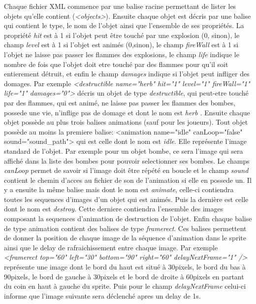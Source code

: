 		Chaque fichier XML commence par une balise racine permettant de lister les objets qu'elle contient (\textit{<objects>}). Ensuite chaque objet est décris par une balise  qui contient le type, le nom de l'objet ainsi que l'ensemble de ses propriétés. La propriété \textit{hit} est à 1 si l'objet peut être touché par une explosion (0, sinon), le champ \textit{level} est à 1 si l'objet est animés (0,sinon), le champ \textit{fireWall} est à 1 si l'objet ne laisse pas passer les flammes des explosions, le champ \textit{life} indique le nombre de fois que l'objet doit etre touché par des flammes pour qu'il soit entierement détruit, et enfin le champ \textit{damages} indique si l'objet peut infliger des domages. Par exemple \textit{<destructible name="herb" hit="1" level="1" fireWall="1" life="1" damages="0">} décris un objet de type \textit{destructible}, qui peut-etre touché par des flammes, qui est animé, ne laisse pas passer les flammes des bombes, possede une vie,  n'inflige pas de domage et dont le nom est \textit{herb} . Ensuite chaque objet possède au plus trois balises animations (sauf pour les joueurs). Tout objet possède au moins la premiere balise:  <animation name="idle" canLoop="false" sound="sound\_path"> qui est celle dont le nom est \textit{idle}. Elle représente l'image standard de l'objet. Par exemple pour un objet bombe, ce sera l'image qui sera affiché dans la liste des bombes pour pouvoir selectionner ses bombes. Le champs \textit{canLoop} permet de savoir si l'image doit être répété en boucle et le champ \textit{sound} contient le chemin d'acces au fichier de son de l'animation si elle en possede un. Il y a ensuite la même balise mais dont le nom est \textit{animate}, celle-ci contiendra toutes les sequences d'images d'un objet qui est animés. Puis la dernière est celle dont le nom est \textit{destroy}. Cette derniere contiendra l'ensemble des images composant la sequences d'animation de destruction de l'objet. Enfin chaque balise de type animation contient des balises de type \textit{framerect}. Ces balises permettent de donner la position de chaque image de la séquence d'animation dans le sprite ainsi que le delay de rafraichissement entre chaque image. Par exemple \textit{<framerect top="60" left="30" bottom="90" right="60" delayNextFrame="1" />} représente une image dont le bord du haut est situé à 30pixels, le bord du bas à 90pixels, le bord de gauche à 30pixels et le bord de droite à 60pixels en partant du coin en haut à gauche du sprite. Puis pour le champ \textit{delayNextFrame} celui-ci informe que l'image suivante sera déclenché apres un delay de 1s.\\
		

